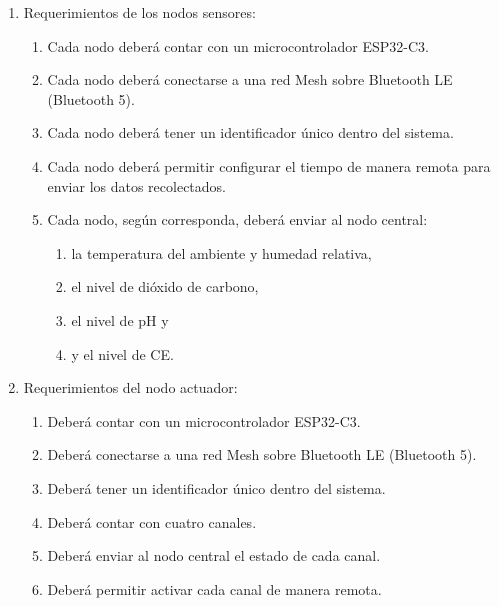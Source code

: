 \documentclass[
11pt, %
codirector, %
]{charter}
\begin{document}
\begin{enumerate}
	\item Requerimientos de los nodos sensores:
	      \begin{enumerate}
		      \item Cada nodo deberá contar con un microcontrolador ESP32-C3.
		      \item Cada nodo deberá conectarse a una red Mesh sobre Bluetooth LE (Bluetooth 5).
		      \item Cada nodo deberá tener un identificador único dentro del sistema.
		      \item Cada nodo deberá permitir configurar el tiempo de manera remota para enviar los
		            datos recolectados.
		      \item Cada nodo, según corresponda, deberá enviar al nodo central:
		            \begin{enumerate}
			            \item la temperatura del ambiente y humedad relativa,
			            \item el nivel de dióxido de carbono,
			            \item el nivel de pH y
			            \item y el nivel de CE.
		            \end{enumerate}
	      \end{enumerate}

	\item Requerimientos del nodo actuador:
	      \begin{enumerate}
		      \item Deberá contar con un microcontrolador ESP32-C3.
		      \item Deberá conectarse a una red Mesh sobre Bluetooth LE (Bluetooth 5).
		      \item Deberá tener un identificador único dentro del sistema.
		      \item Deberá contar con cuatro canales.
		      \item Deberá enviar al nodo central el estado de cada canal.
		      \item Deberá permitir activar cada canal de manera remota.
	      \end{enumerate}


\end{enumerate}
\end{document}
